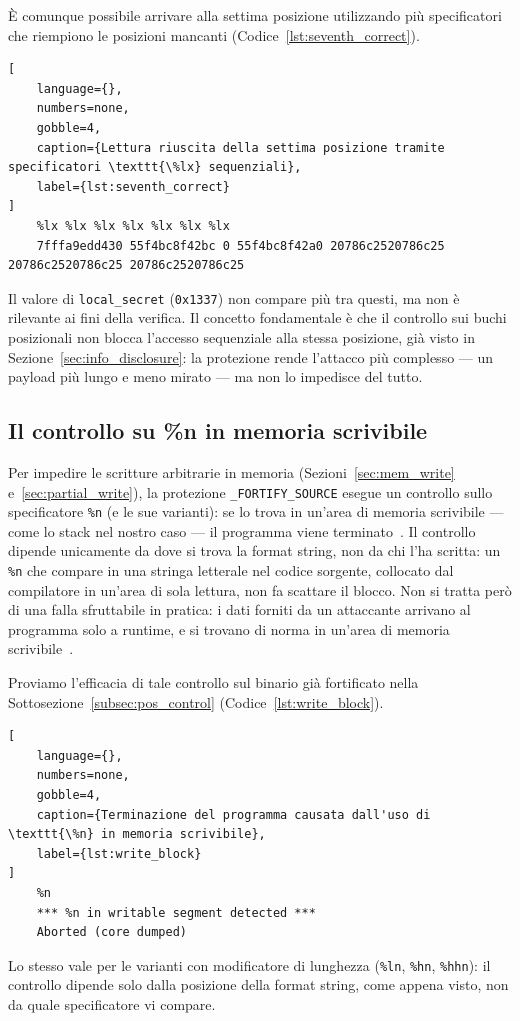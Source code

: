 È comunque possibile arrivare alla settima posizione utilizzando più specificatori che riempiono le posizioni mancanti 
(Codice~\ref{lst:seventh_correct}).
\begin{lstlisting}[
    language={},
    numbers=none,
    gobble=4,
    caption={Lettura riuscita della settima posizione tramite specificatori \texttt{\%lx} sequenziali},
    label={lst:seventh_correct}
]
    %lx %lx %lx %lx %lx %lx %lx
    7fffa9edd430 55f4bc8f42bc 0 55f4bc8f42a0 20786c2520786c25 20786c2520786c25 20786c2520786c25
\end{lstlisting}
Il valore di \texttt{local\_secret} (\texttt{0x1337}) non compare più tra questi, ma non è rilevante ai fini della verifica. Il concetto fondamentale è che il controllo sui buchi posizionali non blocca l'accesso sequenziale alla stessa posizione, già visto in Sezione~\ref{sec:info_disclosure}: la protezione rende l'attacco più complesso --- un payload più lungo e meno mirato --- ma non lo impedisce del tutto.

\subsection{Il controllo su \%n in memoria scrivibile}\label{subsec:write_control}
Per impedire le scritture arbitrarie in memoria (Sezioni~\ref{sec:mem_write} e~\ref{sec:partial_write}), la protezione \texttt{\_FORTIFY\_SOURCE} esegue un controllo sullo specificatore \texttt{\%n} (e le sue varianti): se lo trova in un'area di memoria scrivibile --- come lo stack nel nostro caso --- il programma viene terminato~\cite{captainplanet2010}. Il controllo dipende unicamente da dove si trova la format string, non da chi l'ha scritta: un \texttt{\%n} che compare in una stringa letterale nel codice sorgente, collocato dal compilatore in un'area di sola lettura, non fa scattare il blocco. Non si tratta però di una falla sfruttabile in pratica: i dati forniti da un attaccante arrivano al programma solo a runtime, e si trovano di norma in un'area di memoria scrivibile~\cite{jelinek2004}.

Proviamo l'efficacia di tale controllo sul binario già fortificato nella Sottosezione~\ref{subsec:pos_control} (Codice~\ref{lst:write_block}).
\begin{lstlisting}[
    language={},
    numbers=none,
    gobble=4,
    caption={Terminazione del programma causata dall'uso di \texttt{\%n} in memoria scrivibile},
    label={lst:write_block}
]
    %n
    *** %n in writable segment detected ***
    Aborted (core dumped)
\end{lstlisting}
Lo stesso vale per le varianti con modificatore di lunghezza (\texttt{\%ln}, \texttt{\%hn}, \texttt{\%hhn}): il controllo dipende solo dalla posizione della format string, come appena visto, non da quale specificatore vi compare.

